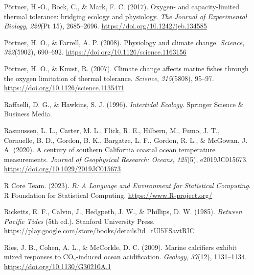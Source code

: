 \documentclass{CSUNthesis}
\begin{document}
\vspace{0.1em}

Pörtner, H.-O., Bock, C., \& Mark, F. C. (2017). Oxygen- and capacity-limited thermal tolerance: bridging ecology and physiology. \textit{The Journal of Experimental Biology}, \textit{220}(Pt 15), 2685--2696. \url{https://doi.org/10.1242/jeb.134585}

\vspace{0.1em}

Pörtner, H. O., \& Farrell, A. P. (2008). Physiology and climate change. \textit{Science}, \textit{322}(5902), 690--692. \url{https://doi.org/10.1126/science.1163156}

\vspace{0.1em}

Pörtner, H. O., \& Knust, R. (2007). Climate change affects marine fishes through the oxygen limitation of thermal tolerance. \textit{Science}, \textit{315}(5808), 95--97. \url{https://doi.org/10.1126/science.1135471}

\vspace{0.1em}

Raffaelli, D. G., \& Hawkins, S. J. (1996). \textit{Intertidal Ecology}. Springer Science \& Business Media.

\vspace{0.1em}

Rasmussen, L. L., Carter, M. L., Flick, R. E., Hilbern, M., Fumo, J. T., Cornuelle, B. D., Gordon, B. K., Bargatze, L. F., Gordon, R. L., \& McGowan, J. A. (2020). A century of southern California coastal ocean temperature measurements. \textit{Journal of Geophysical Research: Oceans}, \textit{125}(5), e2019JC015673. \url{https://doi.org/10.1029/2019JC015673}

\vspace{0.1em}

R Core Team. (2023). \textit{R: A Language and Environment for Statistical Computing}. R Foundation for Statistical Computing. \url{https://www.R-project.org/}

\vspace{0.1em}

Ricketts, E. F., Calvin, J., Hedgpeth, J. W., \& Phillips, D. W. (1985). \textit{Between Pacific Tides} (5th ed.). Stanford University Press. \url{https://play.google.com/store/books/details?id=tUl5ESavtRIC}

\vspace{0.1em}

Ries, J. B., Cohen, A. L., \& McCorkle, D. C. (2009). Marine calcifiers exhibit mixed responses to CO\(_2\)-induced ocean acidification. \textit{Geology}, \textit{37}(12), 1131--1134. \url{https://doi.org/10.1130/G30210A.1}
\end{document}

